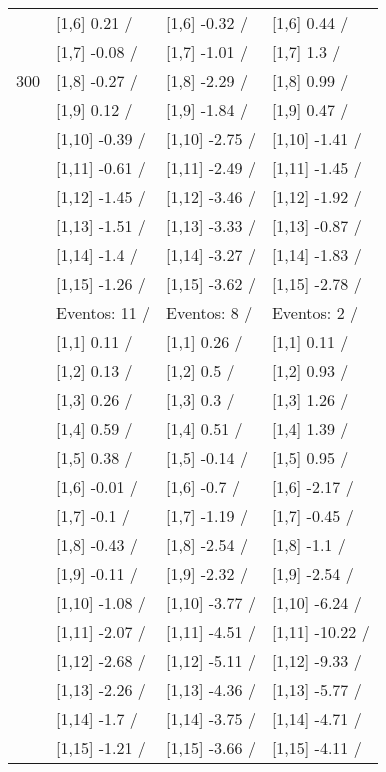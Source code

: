 \begin{table}
\begin{tabular}[t]{llll}
 & {}[1,6] 0.21  / & {}[1,6] -0.32  / & {}[1,6] 0.44  /\\
 & {}[1,7] -0.08  / & {}[1,7] -1.01  / & {}[1,7] 1.3  /\\
300 & {}[1,8] -0.27  / & {}[1,8] -2.29  / & {}[1,8] 0.99  /\\
\addlinespace
 & {}[1,9] 0.12  / & {}[1,9] -1.84  / & {}[1,9] 0.47  /\\
 & {}[1,10] -0.39  / & {}[1,10] -2.75  / & {}[1,10] -1.41  /\\
 & {}[1,11] -0.61  / & {}[1,11] -2.49  / & {}[1,11] -1.45  /\\
 & {}[1,12] -1.45  / & {}[1,12] -3.46  / & {}[1,12] -1.92  /\\
 & {}[1,13] -1.51  / & {}[1,13] -3.33  / & {}[1,13] -0.87  /\\
\addlinespace
 & {}[1,14] -1.4  / & {}[1,14] -3.27  / & {}[1,14] -1.83  /\\
 & {}[1,15] -1.26  / & {}[1,15] -3.62  / & {}[1,15] -2.78  /\\
 & Eventos:  11 / & Eventos:  8 / & Eventos:  2 /\\
 & {}[1,1] 0.11  / & {}[1,1] 0.26  / & {}[1,1] 0.11  /\\
 & {}[1,2] 0.13  / & {}[1,2] 0.5  / & {}[1,2] 0.93  /\\
\addlinespace
 & {}[1,3] 0.26  / & {}[1,3] 0.3  / & {}[1,3] 1.26  /\\
 & {}[1,4] 0.59  / & {}[1,4] 0.51  / & {}[1,4] 1.39  /\\
 & {}[1,5] 0.38  / & {}[1,5] -0.14  / & {}[1,5] 0.95  /\\
 & {}[1,6] -0.01  / & {}[1,6] -0.7  / & {}[1,6] -2.17  /\\
 & {}[1,7] -0.1  / & {}[1,7] -1.19  / & {}[1,7] -0.45  /\\
\addlinespace
500 & {}[1,8] -0.43  / & {}[1,8] -2.54  / & {}[1,8] -1.1  /\\
 & {}[1,9] -0.11  / & {}[1,9] -2.32  / & {}[1,9] -2.54  /\\
 & {}[1,10] -1.08  / & {}[1,10] -3.77  / & {}[1,10] -6.24  /\\
 & {}[1,11] -2.07  / & {}[1,11] -4.51  / & {}[1,11] -10.22  /\\
 & {}[1,12] -2.68  / & {}[1,12] -5.11  / & {}[1,12] -9.33  /\\
\addlinespace
 & {}[1,13] -2.26  / & {}[1,13] -4.36  / & {}[1,13] -5.77  /\\
 & {}[1,14] -1.7  / & {}[1,14] -3.75  / & {}[1,14] -4.71  /\\
 & {}[1,15] -1.21  / & {}[1,15] -3.66  / & {}[1,15] -4.11  /\\
\bottomrule
\end{tabular}
\end{table}
